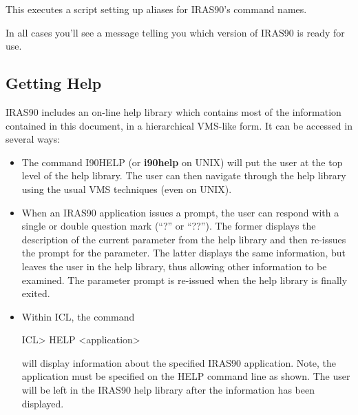 \documentclass[11pt,nolof,noabs]{starlink}
\begin{document}
\small
\begin{terminalv}
\end{terminalv}
\normalsize
This executes a script setting up aliases for {\small IRAS90}'s command names.

In all cases you'll see a message telling you which version of {\small IRAS90}
is ready for use.

\subsection{Getting Help}
{\small IRAS90} includes an on-line help library which contains most of the
information contained in this document, in a hierarchical VMS-like form. It can
be accessed in several ways:
\begin {itemize}
\item The command {\small I90HELP} (or \textbf{i90help} on {\small UNIX}) will put
the user at the top level of the help library. The user can then navigate
through the help library using the usual {\small VMS} techniques (even on
{\small UNIX}). \item When an {\small IRAS90} application issues a prompt, the
user can respond with a single or double question mark (``?'' or ``??''). The
former displays the description of the current parameter from the help library
and then re-issues the prompt for the parameter. The latter displays the same
information, but leaves the user in the help library, thus allowing other
information to be examined. The parameter prompt is re-issued when the help
library is finally exited.
\item Within {\small ICL}, the command

\small
\begin{terminalv}
ICL> HELP <application>
\end{terminalv}
\normalsize
will display information about the specified {\small IRAS90} application. Note,
the application must be specified on the {\small HELP} command line as shown. The user
will be left in the {\small IRAS90} help library after the information has been
displayed.
\end{itemize}
\end{document}
